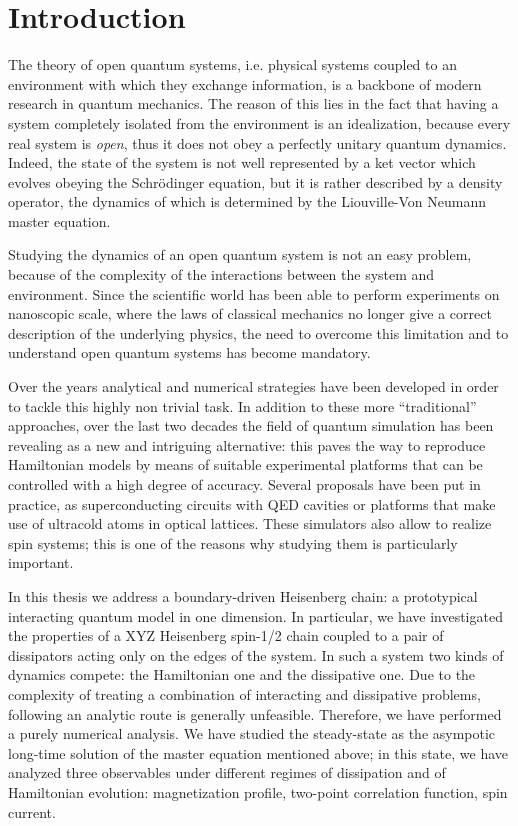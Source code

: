 \chapter*{Introduction}
\label{Introduction}

The theory of open quantum systems, i.e. physical systems coupled to an environment with which they exchange information, is a backbone of modern research in quantum mechanics. The reason of this lies in the fact that having a system completely isolated from the environment is an idealization, because every real system is \emph{open}, thus it does not obey a perfectly unitary quantum dynamics. Indeed, the state of the system is not well represented by a ket vector which evolves obeying the Schr\"{o}dinger equation, but it is rather described by a density operator, the dynamics of which is determined by the Liouville-Von Neumann master equation.

Studying the dynamics of an open quantum system is not an easy problem, because of the complexity of the interactions between the system and environment. Since the scientific world has been able to perform experiments on nanoscopic scale, where the laws of classical mechanics no longer give a correct description of the underlying physics, the need to overcome this limitation and to understand open quantum systems has become mandatory.

Over the years analytical and numerical strategies have been developed in order to tackle this highly non trivial task. In addition to these more ``traditional'' approaches, over the last two decades the field of quantum simulation has been revealing as a new and intriguing alternative: this paves the way to reproduce Hamiltonian models by means of suitable experimental platforms that can be controlled with a high degree of accuracy. Several proposals have been put in practice, as superconducting circuits with QED cavities or platforms that make use of ultracold atoms in optical lattices. These simulators also allow to realize spin systems; this is one of the reasons why studying them is particularly important.

In this thesis we address a boundary-driven Heisenberg chain: a prototypical interacting quantum model in one dimension. In particular, we have investigated the properties of a XYZ Heisenberg spin-1/2 chain coupled to a pair of dissipators acting only on the edges of the system. In such a system two kinds of dynamics compete: the Hamiltonian one and the dissipative one. Due to the complexity of treating a combination of interacting and dissipative problems, following an analytic route is generally unfeasible. Therefore, we have performed a purely numerical analysis. We have studied the steady-state as the asympotic long-time solution of the master equation mentioned above; in this state, we have analyzed three observables under different regimes of dissipation and of Hamiltonian evolution: magnetization profile, two-point correlation function, spin current.

